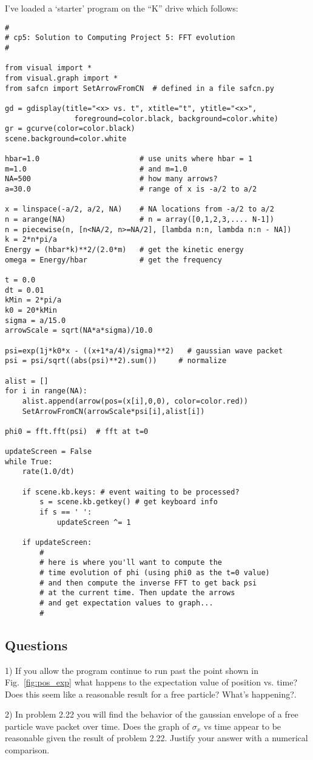 \documentclass[11pt]{article} %
\begin{document}
I've loaded a `starter' program on the ``K'' drive which follows:

\begin{verbatim}
#
# cp5: Solution to Computing Project 5: FFT evolution
#

from visual import *
from visual.graph import *
from safcn import SetArrowFromCN  # defined in a file safcn.py 

gd = gdisplay(title="<x> vs. t", xtitle="t", ytitle="<x>", 
                foreground=color.black, background=color.white)
gr = gcurve(color=color.black)
scene.background=color.white

hbar=1.0                       # use units where hbar = 1
m=1.0                          # and m=1.0
NA=500                         # how many arrows?
a=30.0                         # range of x is -a/2 to a/2

x = linspace(-a/2, a/2, NA)    # NA locations from -a/2 to a/2
n = arange(NA)                 # n = array([0,1,2,3,.... N-1])
n = piecewise(n, [n<NA/2, n>=NA/2], [lambda n:n, lambda n:n - NA])
k = 2*n*pi/a
Energy = (hbar*k)**2/(2.0*m)   # get the kinetic energy
omega = Energy/hbar            # get the frequency

t = 0.0
dt = 0.01
kMin = 2*pi/a
k0 = 20*kMin
sigma = a/15.0
arrowScale = sqrt(NA*a*sigma)/10.0

psi=exp(1j*k0*x - ((x+1*a/4)/sigma)**2)   # gaussian wave packet
psi = psi/sqrt((abs(psi)**2).sum())     # normalize

alist = []
for i in range(NA):
    alist.append(arrow(pos=(x[i],0,0), color=color.red))
    SetArrowFromCN(arrowScale*psi[i],alist[i])
    
phi0 = fft.fft(psi)  # fft at t=0

updateScreen = False
while True:
    rate(1.0/dt)

    if scene.kb.keys: # event waiting to be processed?
        s = scene.kb.getkey() # get keyboard info
        if s == ' ':
            updateScreen ^= 1
    
    if updateScreen:
		#
		# here is where you'll want to compute the 
		# time evolution of phi (using phi0 as the t=0 value)
		# and then compute the inverse FFT to get back psi
		# at the current time. Then update the arrows
		# and get expectation values to graph...
		#        

\end{verbatim}

\subsection*{Questions}

1) If you allow the program continue to run past the point shown in Fig.~\ref{fig:pos_exp} what happens to the expectation value of position vs. time? Does this seem like a reasonable result for a free particle? What's happening?.

2) In problem 2.22 you will find the behavior of the gaussian envelope of a free particle wave packet over time. Does the graph of $\sigma_x$ vs time appear to be reasonable given the result of problem 2.22. Justify your answer with a numerical comparison.
\end{document}
